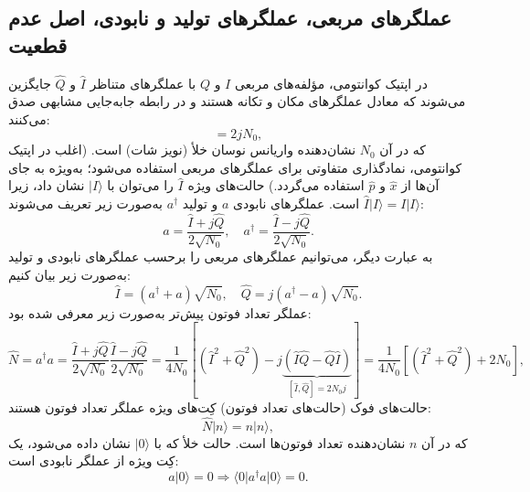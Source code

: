\subsection{عملگرهای مربعی، عملگرهای تولید و نابودی، اصل عدم قطعیت}
\label{subsec:7-5-1}
در اپتیک کوانتومی، مؤلفه‌های مربعی $I$ و $Q$ با عملگرهای متناظر $\hat{I}$ و $\hat{Q}$ جایگزین می‌شوند که معادل عملگرهای مکان و تکانه هستند و در رابطه جابه‌جایی مشابهی صدق می‌کنند:
\begin{equation}
	[\hat{I}, \hat{Q}] = 2jN_0,
	\label{eq:7-68}
\end{equation}
که در آن $N_0$ نشان‌دهنده واریانس نوسان خلأ (نویز شات) است. (اغلب در اپتیک کوانتومی، نمادگذاری متفاوتی برای عملگرهای مربعی استفاده می‌شود؛ به‌ویژه به جای آن‌ها از $\hat{x}$ و $\hat{p}$ استفاده می‌گردد.) حالت‌های ویژه $\hat{I}$ را می‌توان با $|I\rangle$ نشان داد، زیرا $\hat{I}|I\rangle = I|I\rangle$ است.
عملگرهای نابودی $a$ و تولید $a^\dagger$ به‌صورت زیر تعریف می‌شوند:
\begin{equation}
	a = \frac{\hat{I} + j\hat{Q}}{2\sqrt{N_0}}, \quad a^\dagger = \frac{\hat{I} - j\hat{Q}}{2\sqrt{N_0}}.
	\label{eq:7-69}
\end{equation}
به عبارت دیگر، می‌توانیم عملگرهای مربعی را برحسب عملگرهای نابودی و تولید به‌صورت زیر بیان کنیم:
\begin{equation}
	\hat{I} = (a^\dagger + a)\sqrt{N_0}, \quad \hat{Q} = j(a^\dagger - a)\sqrt{N_0}.
	\label{eq:7-70}
\end{equation}
عملگر تعداد فوتون پیش‌تر به‌صورت زیر معرفی شده بود:
\begin{equation}
	\hat{N} = a^\dagger a = \frac{\hat{I} + j\hat{Q}}{2\sqrt{N_0}} \frac{\hat{I} - j\hat{Q}}{2\sqrt{N_0}} = \frac{1}{4N_0} \left[ (\hat{I}^2 + \hat{Q}^2) - j \underbrace{(\hat{I}\hat{Q} - \hat{Q}\hat{I})}_{[\hat{I}, \hat{Q}] = 2N_0 j} \right] = \frac{1}{4N_0} [(\hat{I}^2 + \hat{Q}^2) + 2N_0],
	\label{eq:7-71}
\end{equation}
حالت‌های فوک (حالت‌های تعداد فوتون) کِت‌های ویژه عملگر تعداد فوتون هستند:
\begin{equation}
	\hat{N}|n\rangle = n|n\rangle,
	\label{eq:7-72}
\end{equation}
که در آن $n$ نشان‌دهنده تعداد فوتون‌ها است.
حالت خلأ که با $|0\rangle$ نشان داده می‌شود، یک کِت ویژه از عملگر نابودی است:
\begin{equation}
	a|0\rangle = 0 \Rightarrow \langle 0 | a^\dagger a | 0 \rangle = 0.
	\label{eq:7-73}
\end{equation}
